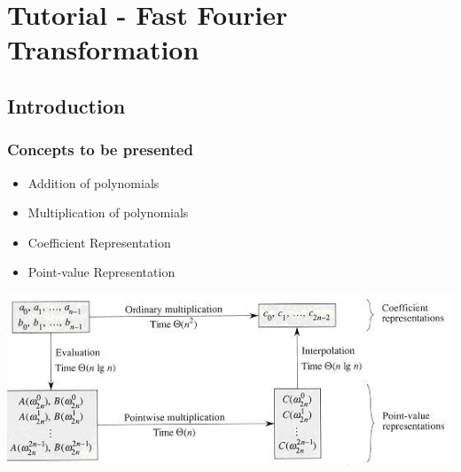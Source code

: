 \section{Tutorial - Fast Fourier Transformation }

\subsection{Introduction}

\begin{frame}
\frametitle{Concepts to be presented}

\begin{itemize}
\item Addition of polynomials
\item Multiplication of polynomials
\item Coefficient Representation
\item Point-value Representation
\end{itemize}

\includegraphics[scale=0.5]{images/poly-transform.jpg}

\end{frame}
